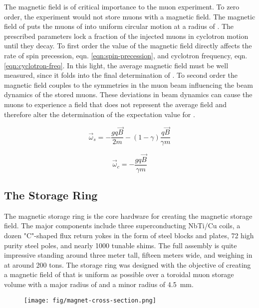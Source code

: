 The magnetic field is of critical importance to the muon \gmtwo experiment. To zero order, the experiment would not store muons with a magnetic field.  The magnetic field of \bmagic puts the muons of \rmagic into uniform circular motion at a radius of \pmagic.  The prescribed parameters lock a fraction of the injected muons in cyclotron motion until they decay.  To first order the value of the magnetic field directly affects the rate of spin precession, eqn. \ref{eqn:spin-precession}, and cyclotron frequency, eqn. \ref{eqn:cyclotron-freq}.  In this light, the average magnetic field must be well measured, since it folds into the final determination of \wa.  To second order the magnetic field couples to the symmetries in the muon beam influencing the beam dynamics of the stored muons.  These deviations in beam dynamics can cause the muons to experience a field that does not represent the average field and therefore alter the determination of the expectation value for \wa.

\begin{equation}
\vec{\omega}_s = -\frac{gq\vec{B}}{2m} - (1 - \gamma) \frac{q\vec{B}}{\gamma m}
\label{eqn:spin-precession}
\end{equation}

\begin{equation}
\vec{\omega}_c = -\frac{gq\vec{B}}{\gamma m}
\label{eqn:cyclotron-freq}
\end{equation}

\subsection{The Storage Ring}

The magnetic storage ring is the core hardware for creating the magnetic storage field.  The major components include three superconducting NbTi/Cu coils, a dozen "C"-shaped flux return yokes in the form of steel blocks and plates, 72 high purity steel poles, and nearly 1000 tunable shims.  The full assembly is quite impressive standing around three meter tall, fifteen meters wide, and weighing in at around 200 tons.  The storage ring was designed with the objective of creating a magnetic field of \bmagic that is uniform as possible over a toroidal muon storage volume with a major radius of \rmagic and a minor radius of \SI{4.5}{\mm}.

\begin{figure}
\texttt{[image: fig/magnet-cross-section.png]}
\caption{}
\label{fig:magnet-cross-section}
\end{figure}

